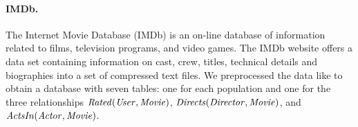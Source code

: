 {				\paragraph{IMDb.} 
				The Internet Movie Database (IMDb) is an on-line database of information related to films, television programs, and video games.
				The IMDb website offers a data set containing information on cast, crew, titles, technical details and biographies into a set of compressed text files. 
				We preprocessed the data like \citep{Peralta2007} to obtain a database with seven tables: one for each population and one for the three relationships $\it{Rated}(\it{User},\it{Movie})$, $\it{Directs}(\it{Director},\it{Movie})$, and $\it{ActsIn}(\mathit{Actor},\it{Movie})$.
				
				
}
